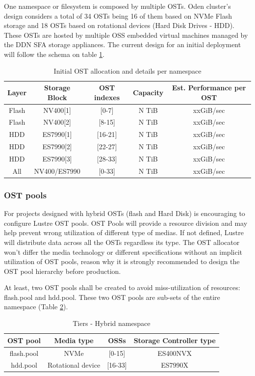 \documentclass{article}
\begin{document}
One namespace or filesystem is composed by multiple OSTs. Oden cluster's design considers a total of 34 OSTs being 16 of them based on NVMe Flash storage and 18 OSTs based on rotational devices (Hard Disk Drives - HDD). These OSTs are hosted by multiple OSS embedded virtual machines managed by the DDN SFA storage appliances. 
The current design for an initial deployment will follow the schema on table \ref{tab:ost-allocation}.
\begin{table}[h]
\centering
 \begin{tabular}{||c c c c c||} 
 \hline
 Layer & Storage Block & OST indexes & Capacity & Est. Performance per OST\\ [0.5ex] 
 \hline\hline
 Flash & NV400[1] & [0-7] & N TiB & xxGiB/sec \\ 
 \hline
 Flash & NV400[2] & [8-15] & N TiB & xxGiB/sec \\ 
 \hline
 HDD & ES7990[1] & [16-21] & N TiB & xxGiB/sec \\
 \hline
 HDD & ES7990[2] & [22-27] & N TiB & xxGiB/sec \\
 \hline
 HDD & ES7990[3] & [28-33] & N TiB & xxGiB/sec \\
 \hline
 All & NV400/ES7990 & [0-33] & N TiB & xxGiB/sec \\ [1ex] 
 \hline
\end{tabular}
\caption{Initial OST allocation and details per namespace}
\label{tab:ost-allocation}
\end{table}

\subsubsection{OST pools}
For projects designed with hybrid OSTs (flash and Hard Disk) is encouraging to configure Lustre OST pools. OST Pools will provide a resource division and may help prevent wrong utilization of different type of medias. If not defined, Lustre will distribute data across all the OSTs regardless its type. The OST allocator won't differ the media technology or different specifications without an implicit utilization of OST pools, reason why it is strongly recommended to design the OST pool hierarchy before production.

At least, two OST pools shall be created to avoid miss-utilization of resources: flash.pool and hdd.pool. These two OST pools are sub-sets of the entire namespace (Table \ref{tab:ost-pools}).

\begin{table}[h]
\centering
 \begin{tabular}{||c c c c||} 
 \hline
 OST pool & Media type & OSSs & Storage Controller type \\ [0.5ex] 
 \hline\hline
 flash.pool & NVMe & [0-15] & ES400NVX \\ 
 \hline
 hdd.pool & Rotational device & [16-33] & ES7990X\\
 \hline
 \end{tabular}
 \caption{Tiers - Hybrid namespace}
 \label{tab:ost-pools}
\end{table}
\end{document}
